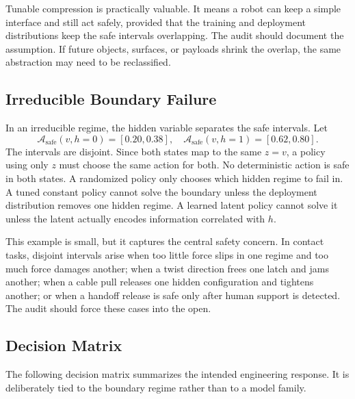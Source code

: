 \documentclass{article}
\begin{document}
Tunable compression is practically valuable. It means a robot can keep a simple
interface and still act safely, provided that the training and deployment
distributions keep the safe intervals overlapping. The audit should document the
assumption. If future objects, surfaces, or payloads shrink the overlap, the same
abstraction may need to be reclassified.

\subsection{Irreducible Boundary Failure}

In an irreducible regime, the hidden variable separates the safe intervals. Let
\begin{equation}
    \mathcal{A}_{\mathrm{safe}}(v,h=0) = [0.20,0.38],
    \quad
    \mathcal{A}_{\mathrm{safe}}(v,h=1) = [0.62,0.80].
\end{equation}
The intervals are disjoint. Since both states map to the same $z=v$, a policy
using only $z$ must choose the same action for both. No deterministic action is
safe in both states. A randomized policy only chooses which hidden regime to
fail in. A tuned constant policy cannot solve the boundary unless the deployment
distribution removes one hidden regime. A learned latent policy cannot solve it
unless the latent actually encodes information correlated with $h$.

This example is small, but it captures the central safety concern. In contact
tasks, disjoint intervals arise when too little force slips in one regime and too
much force damages another; when a twist direction frees one latch and jams
another; when a cable pull releases one hidden configuration and tightens
another; or when a handoff release is safe only after human support is detected.
The audit should force these cases into the open.

\subsection{Decision Matrix}

The following decision matrix summarizes the intended engineering response. It
is deliberately tied to the boundary regime rather than to a model family.
\end{document}
